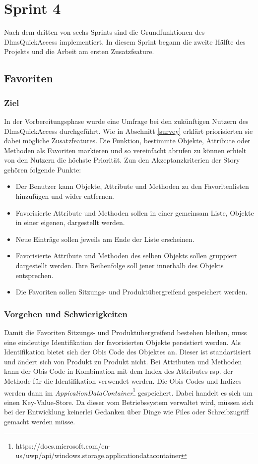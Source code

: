 \section{Sprint 4}\label{sprint4}
Nach dem dritten von sechs Sprints sind die Grundfunktionen des DlmsQuickAccess implementiert.
In diesem Sprint begann die zweite Hälfte des Projekts und die Arbeit am ersten Zusatzfeature.


\subsection{Favoriten}

\subsubsection{Ziel}
In der Vorbereitungsphase wurde eine Umfrage bei den zukünftigen Nutzern des DlmsQuickAccess durchgeführt.
Wie in Abschnitt \ref{survey} erklärt priorisierten sie dabei mögliche Zusatzfeatures.
Die Funktion, bestimmte Objekte, Attribute oder Methoden als Favoriten markieren und so vereinfacht abrufen zu können erhielt von den Nutzern die höchste Priorität.
Zun den Akzeptanzkriterien der Story gehören folgende Punkte:
\begin{itemize}
   \item Der Benutzer kann Objekte, Attribute und Methoden zu den Favoritenlisten hinzufügen und wider entfernen.
   \item Favorisierte Attribute und Methoden sollen in einer gemeinsam Liste, Objekte in einer eigenen, dargestellt werden.
   \item Neue Einträge sollen jeweils am Ende der Liste erscheinen.
   \item Favorisierte Attribute und Methoden des selben Objekts sollen gruppiert dargestellt werden. Ihre Reihenfolge soll jener innerhalb des Objekts entsprechen.
   \item Die Favoriten sollen Sitzungs- und Produktübergreifend gespeichert werden.
\end{itemize}


\subsubsection{Vorgehen und Schwierigkeiten}
Damit die Favoriten  Sitzungs- und Produktübergreifend bestehen bleiben, muss eine eindeutige Identifikation der favorisierten Objekte persistiert werden.
Als Identifikation bietet sich der Obis Code des Objektes an.
Dieser ist standartisiert und ändert sich von Produkt zu Produkt nicht.
Bei Attributen und Methoden kann der Obis Code in Kombination mit dem Index des Attributes rsp. der Methode für die Identifikation verwendet werden.
Die Obis Codes und Indizes werden dann im \textit{AppicationDataContainer}\footnote{https://docs.microsoft.com/en-us/uwp/api/windows.storage.applicationdatacontainer} gespeichert.
Dabei handelt es sich um einen Key-Value-Store.
Da dieser vom Betriebssystem verwaltet wird, müssen sich bei der Entwicklung keinerlei Gedanken über Dinge wie Files oder Schreibzugriff gemacht werden müsse.

